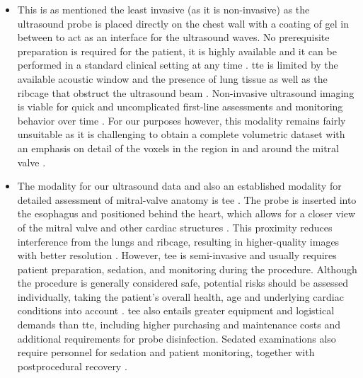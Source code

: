 \begin{itemize}
  \item [\textbf{\Gls{tte}}] This is as mentioned the least invasive (as it is non-invasive) as the ultrasound probe is placed directly on the chest wall with a coating of gel in between to act as an interface for the ultrasound waves. No prerequisite preparation is required for the patient, it is highly available and it can be performed in a standard clinical setting at any time \cite{mayo2026echocardiogram}. \Gls{tte} is limited by the available acoustic window and the presence of lung tissue as well as the ribcage that obstruct the ultrasound beam \cite{peters2011ultrasound}. Non-invasive ultrasound imaging is viable for quick and uncomplicated first-line assessments and monitoring behavior over time \cite{zoghbi2017recommendations}. For our purposes however, this modality remains fairly unsuitable as it is challenging to obtain a complete volumetric dataset with an emphasis on detail of the voxels in the region in and around the mitral valve \cite{lang2012eae}.
  
  \item [\textbf{\Gls{tee}}] The modality for our ultrasound data and also an established modality for detailed assessment of mitral-valve anatomy is \gls{tee} \cite{lang2012eae}. The probe is inserted into the esophagus and positioned behind the heart, which allows for a closer view of the mitral valve and other cardiac structures \cite{mayo2026echocardiogram}. This proximity reduces interference from the lungs and ribcage, resulting in higher-quality images with better resolution \cite{peters2011ultrasound}. However, \gls{tee} is semi-invasive and usually requires patient preparation, sedation, and monitoring during the procedure. Although the procedure is generally considered safe, potential risks should be assessed individually, taking the patient's overall health, age and underlying cardiac conditions into account \cite{HAHN2013921}. \Gls{tee} also entails greater equipment and logistical demands than \gls{tte}, including higher purchasing and maintenance costs and additional requirements for probe disinfection. Sedated examinations also require personnel for sedation and patient monitoring, together with postprocedural recovery \cite{oren2013concise}.
  

\end{itemize}

